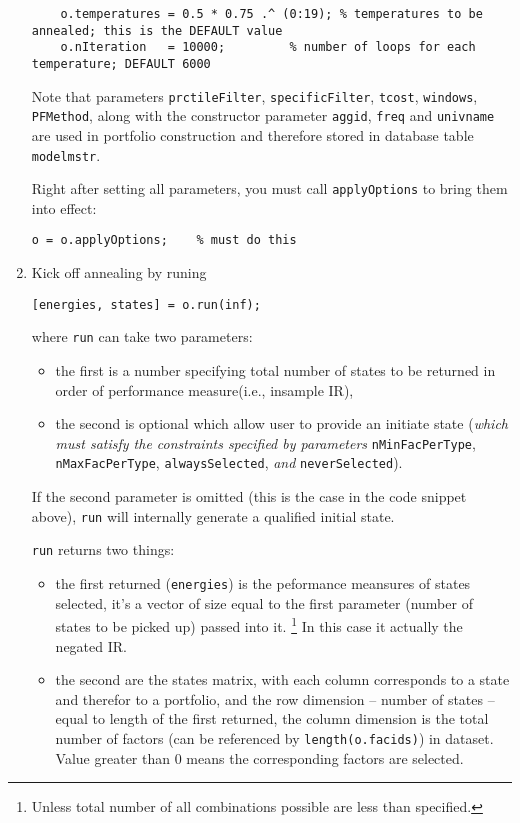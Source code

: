 \documentclass[10pt,oneside,a4paper]{article}
\begin{document}
\begin{enumerate}
\begin{lstlisting}[firstnumber=last]
	%% Annealing parameters: increasing nIteration costs more time but gets more reliable results
	o.temperatures = 0.5 * 0.75 .^ (0:19); % temperatures to be annealed; this is the DEFAULT value
	o.nIteration   = 10000;         % number of loops for each temperature; DEFAULT 6000
\end{lstlisting}

    Note that parameters \texttt{prctileFilter}, \texttt{specificFilter}, \texttt{tcost}, \texttt{windows},
\texttt{PFMethod}, along with the constructor parameter \texttt{aggid}, \texttt{freq} and \texttt{univname}
are used in portfolio construction and therefore stored in database table \texttt{modelmstr}.

   Right after setting all parameters, you must call \texttt{applyOptions} to bring them into effect:

\begin{lstlisting}[firstnumber=last]
    o = o.applyOptions;    % must do this
\end{lstlisting}

  \item Kick off annealing by runing 

\begin{lstlisting}[firstnumber=last]
    [energies, states] = o.run(inf);
\end{lstlisting}

    where \texttt{run} can take two parameters: 
    \begin{itemize}
	    \item the first is a number specifying total number of states to be returned
	    in order of performance measure(i.e., insample IR), 
	    \item the second is optional which allow user to provide an initiate state
	    (\emph{which must satisfy the constraints specified by parameters}
	    \texttt{nMinFacPerType}, \texttt{nMaxFacPerType}, \texttt{alwaysSelected}, \emph{and} \texttt{neverSelected}). 
    \end{itemize}
    If the second parameter is omitted (this is the case in the code snippet above), \texttt{run} will internally generate 
    a qualified initial state.

  \texttt{run} returns two things:
  \begin{itemize}
	  \item the first returned (\texttt{energies}) is the peformance meansures of states selected,
	  it's a vector of size equal to the first parameter (number of states to be picked up) passed into it.
	   \footnote{Unless total number of all combinations possible are less than specified.}
	  In this case it actually the negated IR.
	  \item the second are the states matrix, with each column corresponds to a state and therefor to a portfolio,
	  and the row dimension -- number of states -- equal to length of the first returned,
	  the column dimension is the total number of factors (can be referenced by \texttt{length(o.facids)}) in dataset.
	  Value greater than 0 means the corresponding factors are selected.
  \end{itemize} 


\end{enumerate}
\end{document}

